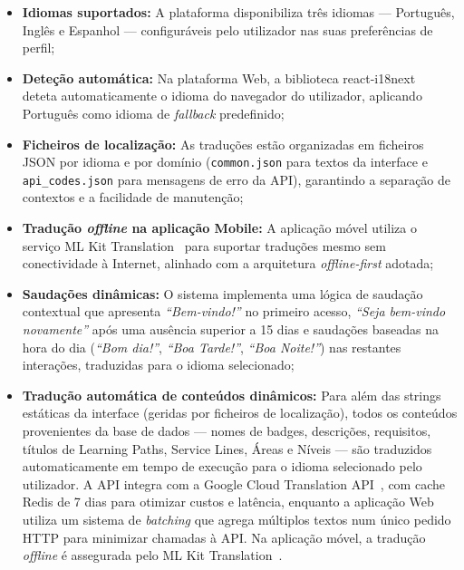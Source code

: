 \documentclass[12pt,a4paper]{report}
\begin{document}
\begin{itemize}
  \item \textbf{Idiomas suportados:} A plataforma disponibiliza três idiomas --- Português, Inglês e Espanhol --- configuráveis pelo utilizador nas suas preferências de perfil;
  \item \textbf{Deteção automática:} Na plataforma Web, a biblioteca react-i18next~\cite{i18next} deteta automaticamente o idioma do navegador do utilizador, aplicando Português como idioma de \textit{fallback} predefinido;
  \item \textbf{Ficheiros de localização:} As traduções estão organizadas em ficheiros JSON por idioma e por domínio (\texttt{common.json} para textos da interface e \texttt{api\_codes.json} para mensagens de erro da API), garantindo a separação de contextos e a facilidade de manutenção;
  \item \textbf{Tradução \textit{offline} na aplicação Mobile:} A aplicação móvel utiliza o serviço ML Kit Translation~\cite{mlkit} para suportar traduções mesmo sem conectividade à Internet, alinhado com a arquitetura \textit{offline-first} adotada;
  \item \textbf{Saudações dinâmicas:} O sistema implementa uma lógica de saudação contextual que apresenta \textit{``Bem-vindo!''} no primeiro acesso, \textit{``Seja bem-vindo novamente''} após uma ausência superior a 15 dias e saudações baseadas na hora do dia (\textit{``Bom dia!''}, \textit{``Boa Tarde!''}, \textit{``Boa Noite!''}) nas restantes interações, traduzidas para o idioma selecionado;
  \item \textbf{Tradução automática de conteúdos dinâmicos:} Para além das strings estáticas da interface (geridas por ficheiros de localização), todos os conteúdos provenientes da base de dados --- nomes de badges, descrições, requisitos, títulos de Learning Paths, Service Lines, Áreas e Níveis --- são traduzidos automaticamente em tempo de execução para o idioma selecionado pelo utilizador. A API integra com a Google Cloud Translation API~\cite{googletranslate}, com cache Redis de 7 dias para otimizar custos e latência, enquanto a aplicação Web utiliza um sistema de \textit{batching} que agrega múltiplos textos num único pedido HTTP para minimizar chamadas à API. Na aplicação móvel, a tradução \textit{offline} é assegurada pelo ML Kit Translation~\cite{mlkit}.
\end{itemize}

\end{document}
